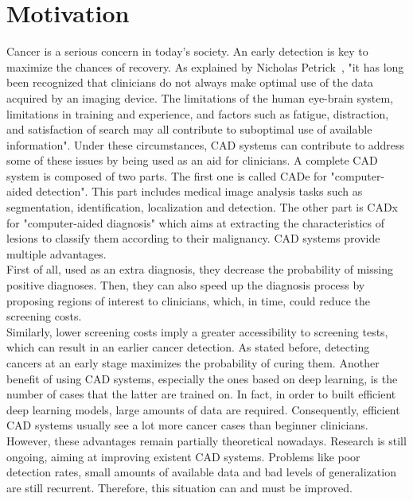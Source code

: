 \section{Motivation}
Cancer is a serious concern in today's society. An early detection is key to maximize the chances of recovery. As explained by Nicholas Petrick~\cite{50}, "it has long been recognized that clinicians do not always make optimal use of the data acquired by an imaging device. The limitations of the human eye-brain system, limitations in training and experience, and factors such as fatigue, distraction, and satisfaction of search may all contribute to suboptimal use of available information". Under these circumstances, CAD systems can contribute to address some of these issues by being used as an aid for clinicians. A complete CAD system is composed of two parts. The first one is called CADe for "computer-aided detection". This part includes medical  image  analysis  tasks  such  as  segmentation,  identification,  localization  and  detection. The other part is CADx for "computer-aided diagnosis" which aims at extracting the characteristics of lesions to classify them according to their malignancy. CAD systems provide multiple advantages.\\
First of all, used as an extra diagnosis, they decrease the probability of missing positive diagnoses. Then, they can also speed up the diagnosis process by proposing regions of interest to clinicians, which, in time, could reduce the screening costs.\\
Similarly, lower screening costs imply a greater accessibility to screening tests, which can result in an earlier cancer detection. As stated before, detecting cancers at an early stage maximizes the probability of curing them. Another benefit of using CAD systems, especially the ones based on deep learning, is the number of cases that the latter are trained on. In fact, in order to built efficient deep learning models, large amounts of data are required. Consequently, efficient CAD systems usually see a lot more cancer cases than beginner clinicians.\\
However, these advantages remain partially theoretical nowadays. Research is still ongoing, aiming at improving existent CAD systems. Problems like poor detection rates, small amounts of available data and bad levels of generalization are still recurrent. Therefore, this situation can and must be improved.




